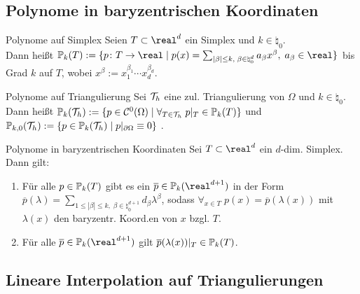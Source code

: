 \subsection{%
    Polynome in baryzentrischen Koordinaten%
}

\begin{Def}{Polynome auf Simplex}
    Seien $T \subset \real^d$ ein Simplex und $k \in \natural_0$.\\
    Dann heißt $\PP_k(T) := \{p\colon T \to \real \;|\;
    p(x) = \sum_{|\beta| \le k,\; \beta \in \natural_0^d} a_\beta x^\beta,\; a_\beta \in \real\}$
     bis Grad $k$ auf $T$,
    wobei $x^\beta := x_1^{\beta_1} \dotsm x_d^{\beta_d}$.
\end{Def}

\begin{Def}{Polynome auf Triangulierung}
    Sei $\mathcal{T}_h$ eine zul. Triangulierung von $\Omega$ und $k \in \natural_0$.\\
    Dann heißt
    $\mathbb{P}_k(\mathcal{T}_h) := \{p \in \mathcal{C}^0(\Omega) \;|\; \forall_{T \in \mathcal{T}_h}\; p|_T \in \mathbb{P}_k(T)\}$
     und
    $\mathbb{P}_{k,0}(\mathcal{T}_h) := \{p \in \mathbb{P}_k(\mathcal{T}_h) \;|\; p|_{\partial\Omega} \equiv 0\}$
    .
\end{Def}

\linie

\begin{Lemma}{Polynome in baryzentrischen Koordinaten}
    Sei $T \subset \real^d$ ein $d$-dim. Simplex.
    Dann gilt:
    \begin{enumerate}
        \item
        Für alle $p \in \mathbb{P}_k(T)$ gibt es ein $\overline{p} \in \PP_k(\real^{d+1})$
        in der Form $\overline{p}(\lambda) = \sum_{1 \le |\beta| \le k,\;
        \beta \in \natural_0^{d+1}} d_\beta \lambda^\beta$, sodass
        $\forall_{x \in T}\; p(x) = \overline{p}(\lambda(x))$ mit
        $\lambda(x)$ den baryzentr. Koord.en von $x$ bzgl. $T$.

        \item
        Für alle $\overline{p} \in \PP_k(\real^{d+1})$ gilt
        $\overline{p}(\lambda(x))|_T \in \mathbb{P}_k(T)$.
    \end{enumerate}
\end{Lemma}

\pagebreak

\subsection{%
    Lineare Interpolation auf Triangulierungen%
}

